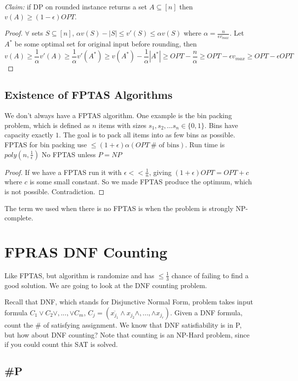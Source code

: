 \documentclass[11pt]{article}
\newcommand{\sse}{\subseteq}
\newcommand{\ep}{\epsilon}
\begin{document}
{\it Claim:} if DP on rounded instance returns a set $A \subseteq [n]$ then $v(A)\ge (1- \ep) OPT$.
\begin{proof}
$\forall$ sets $S\sse [n]$, $\alpha v(S) - |S|\le v'(S) \le \alpha v(S)$ where $\alpha = \frac{n}{\ep v_{max}}$. Let $A^*$ be some optimal set for original input before rounding, then
$$v(A) \ge \frac{1}{\alpha}v'(A) \ge \frac{1}{\alpha}v'(A^*) \ge v(A^*) - \frac{1}{\alpha}|A^*| \ge OPT - \frac{n}{\alpha} \ge OPT - \ep v_{max}\ge OPT - \ep OPT$$
\end{proof}

\subsection{Existence of FPTAS Algorithms}
We don't always have a FPTAS algorithm. One example is the bin packing problem, which is defined as $n$ items with sizes $s_1, s_2,... s_n\in \{0,1\}$. Bins have capacity exactly $1$. The goal is to pack all items into as few bins as possible. FPTAS for bin packing use $\le (1+\ep) \alpha (OPT ~ \#\text{ of bins})$. Run time is $poly (n,\frac{1}{\ep})$ No FPTAS unless $P=NP$
\begin{proof}
If we have a FPTAS run it with $\ep << \frac{1}{n}$, giving $(1 + \ep)OPT=OPT+c$ where $c$ is some small constant. So we made FPTAS produce the optimum, which is not possible. Contradiction.
\end{proof}
The term we used when there is no FPTAS is when the problem is strongly NP-complete.


\section{FPRAS DNF Counting}
Like FPTAS, but algorithm is randomize and has $\le \frac{1}{3}$ chance of failing to find a good solution. We are going to look at the DNF counting problem.

Recall that DNF, which stands for Disjunctive Normal Form, problem takes input formula $C_1 \vee C_2 \vee, ..., \vee C_m$, $C_j=(\overline{x_{j_1}} \wedge x_{j_2} \wedge,...,\wedge x_{j_r})$. Given a DNF formula, count the \# of satisfying assignment. We know that DNF satisfiability is in P, but how about DNF counting? Note that counting is an NP-Hard problem, since if you could count this SAT is solved. 

\subsection{\#P}
\end{document}
